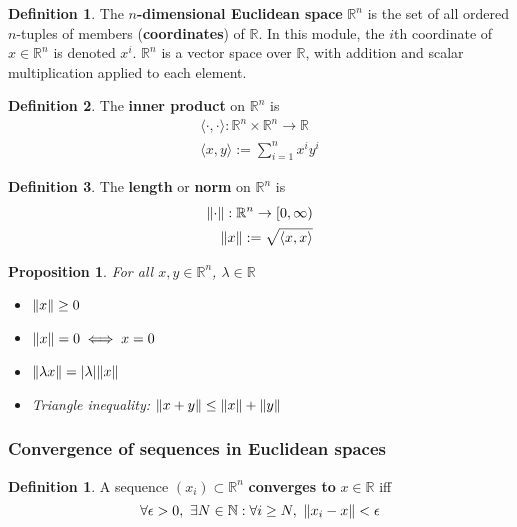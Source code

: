 \documentclass[12pt]{article}
\newtheorem*{prop*}{Proposition}
\theoremstyle{definition}
\newtheorem{defn}{Definition}[section]
\newtheorem*{defn*}{Definition}
\DeclarePairedDelimiter\abs{\lvert}{\rvert}
\DeclarePairedDelimiter\length{\lVert}{\rVert}
\newcommand{\R}{\mathbb{R}}
\newcommand{\N}{\mathbb{N}}
\begin{document}
\begin{defn*}
	The \textbf{$n$-dimensional Euclidean space} $\mathbb{R}^n$ is the set of all ordered $n$-tuples of members (\textbf{coordinates}) of $\mathbb{R}$.
	In this module, the $i$th coordinate of $x \in \mathbb{R}^n$ is denoted $x^i$.
	$\mathbb{R}^n$ is a vector space over $\mathbb{R}$, with addition and scalar multiplication applied to each element.
\end{defn*}

\begin{defn*}
	The \textbf{inner product} on $\mathbb{R}^n$ is
	\begin{align*}
		\langle\cdot,\cdot\rangle : \mathbb{R}^n \times \mathbb{R}^n \to \mathbb{R}\\
		\langle x, y\rangle := \sum_{i = 1}^nx^iy^i
	\end{align*}
\end{defn*}

\begin{defn*}
  The \textbf{length} or \textbf{norm} on $\R^n$ is
  \begin{align*}
    \length{\cdot} : \R^n \to [0, \infty)\\
    \length{x} := \sqrt{\langle x, x \rangle}
  \end{align*}
\end{defn*}

\begin{prop*}
  For all $x, y \in \R^n$, $\lambda \in \R$
  \begin{itemize}
    \item $\length{x} \geq 0$
    \item $\length{x} = 0 \iff x = 0$
    \item $\length{\lambda x} = \abs{\lambda}\length{x}$
    \item Triangle inequality: $\length{x + y} \leq \length{x} + \length{y}$
  \end{itemize}
\end{prop*}

\subsubsection{Convergence of sequences in Euclidean spaces}

\begin{defn}
  A sequence $(x_i) \subset \R^n$ \textbf{converges to} $x \in \R $ iff
  $$\forall \epsilon > 0,\ \exists N \in \N : \forall i \geq N,\ \length{x_i - x} < \epsilon$$
\end{defn}
\end{document}
